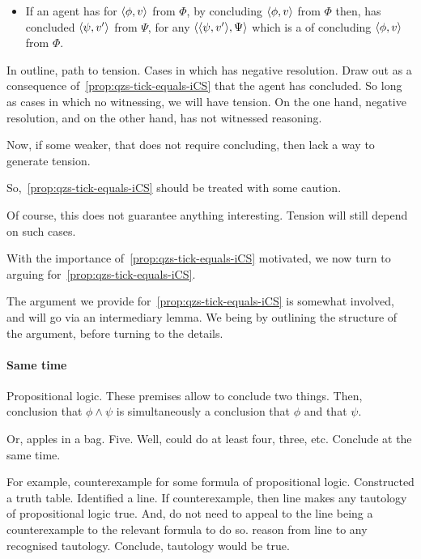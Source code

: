 \begin{note}[Contraposition]
  \begin{itemize}
  \item
    If an agent has \zetaS{} for \(\langle \phi, v \rangle\) from \(\Phi\), by concluding \(\langle \phi, v \rangle\) from \(\Phi\) then, has concluded \(\langle \psi, v' \rangle\) from \(\Psi\), for any \(\langle \langle \psi, v' \rangle, \Psi \rangle\) which is a \requ{} of concluding \(\langle \phi, v \rangle\) from \(\Phi\).
  \end{itemize}

  In outline, path to tension.
  Cases in which \qzS{} has negative resolution.
  Draw out as a consequence of~\autoref{prop:qzs-tick-equals-iCS} that the agent has concluded.
  So long as cases in which no witnessing, we will have tension.
  On the one hand, negative resolution, and on the other hand, has not witnessed reasoning.

  Now, if some weaker, that does not require concluding, then lack a way to generate tension.

  So,~\autoref{prop:qzs-tick-equals-iCS} should be treated with some caution.

  Of course, this does not guarantee anything interesting.
  Tension will still depend on such cases.
\end{note}

\begin{note}
  With the importance of~\autoref{prop:qzs-tick-equals-iCS} motivated, we now turn to arguing for~\autoref{prop:qzs-tick-equals-iCS}.

  The argument we provide for~\autoref{prop:qzs-tick-equals-iCS} is somewhat involved, and will go via an intermediary lemma.
  We being by outlining the structure of the argument, before turning to the details.
\end{note}

\paragraph*{Same time}

\begin{note}
  Propositional logic.
  These premises allow to conclude two things.
  Then, conclusion that \(\phi \land \psi\) is simultaneously a conclusion that \(\phi\) and that \(\psi\).

  Or, apples in a bag.
  Five.
  Well, could do at least four, three, etc.
  Conclude at the same time.
\end{note}

\begin{note}
  For example, counterexample for some formula of propositional logic.
  Constructed a truth table.
  Identified a line.
  If counterexample, then line makes any tautology of propositional logic true.
  And, do not need to appeal to the line being a counterexample to the relevant formula to do so.
  reason from line to any recognised tautology.
  Conclude, tautology would be true.
\end{note}




